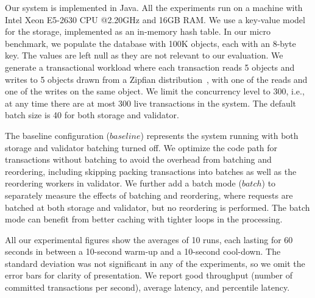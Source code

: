Our system is implemented in Java. All the experiments run on a machine with
Intel Xeon E5-2630 CPU @2.20GHz and 16GB RAM. We use a key-value model for the
storage, implemented as an in-memory hash table. In our micro benchmark, we populate the database with 100K objects, each with an 8-byte key. The values are left null as they are not relevant to our evaluation. We generate a transactional workload where each transaction reads 5 objects and writes to 5 objects drawn from a Zipfian distribution~\cite{gray1994quickly}, with one of the reads and one of the writes on the same object. We limit the concurrency level to 300, i.e., at any time there are at most 300 live transactions in the system. The default batch size is 40 for both storage and validator.

The baseline configuration ($baseline$) represents the system running with both storage and validator batching turned off. We optimize the code path for transactions without batching to avoid the overhead from batching and reordering, including skipping packing transactions into batches as well as the reordering workers in validator. We further add a batch mode ($batch$) to separately measure the effects of batching and reordering, where requests are batched at both storage and validator, but no reordering is performed. The batch mode can benefit from better caching with tighter loops in the processing. 



All our experimental figures show the averages of 10 runs, each lasting for 60 seconds in between a 10-second warm-up and a 10-second cool-down. The standard deviation was not significant in any of the experiments, so we omit the error bars for clarity of presentation. We report good throughput (number of committed transactions per second), average latency, and percentile latency.



